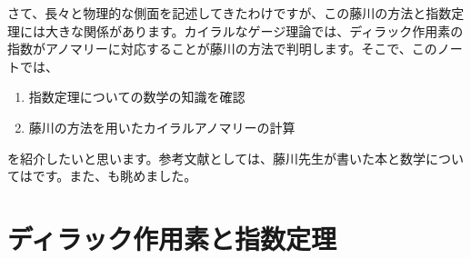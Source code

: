 \documentclass[unicode,a4paper,10pt]{ltjsarticle}
\begin{document}
さて、長々と物理的な側面を記述してきたわけですが、この藤川の方法と指数定理には大きな関係があります。カイラルなゲージ理論では、ディラック作用素の指数がアノマリーに対応することが藤川の方法で判明します。そこで、このノートでは、
\begin{enumerate}
  \item 
  指数定理についての数学の知識を確認
  \item 
  藤川の方法を用いたカイラルアノマリーの計算
\end{enumerate}
を紹介したいと思います。参考文献としては、藤川先生が書いた本\cite{Fujikawa:2001b}と数学については\cite{Nakahara:2003}です。また、\cite{Peskin:1995,Nair:2005}も眺めました。


\section{ディラック作用素と指数定理}













\clearpage


\end{document}
